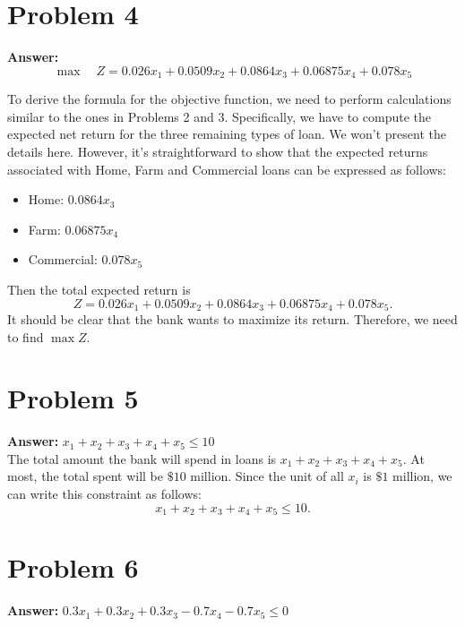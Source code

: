 \documentclass[11pt]{article}
\begin{document}
\section*{Problem 4}
\label{sec:org209078e}

\textbf{Answer:}
\begin{equation*}
\max\quad Z=0.026x_1+0.0509x_2+0.0864x_3+0.06875x_4+0.078x_5
\end{equation*}
\vspace{0.1cm}

To derive the formula for the objective function, we need to perform
calculations similar to the ones in Problems 2 and 3. Specifically, we have to
compute the expected net return for the three remaining types of loan. We won't
present the details here. However, it's straightforward to show that the
expected returns associated with Home, Farm and Commercial loans can be
expressed as follows:
\begin{itemize}
\item Home: \(0.0864x_3\)
\item Farm: \(0.06875x_4\)
\item Commercial: \(0.078x_5\)
\end{itemize}
Then the total expected return is
\begin{equation}
Z=0.026x_1+0.0509x_2+0.0864x_3+0.06875x_4+0.078x_5.
\end{equation}
It should be clear that the bank wants to maximize its return. Therefore, we
need to find \(\max Z\).
\section*{Problem 5}
\label{sec:org612217b}

\textbf{Answer:} \(x_1+x_2+x_3+x_4+x_5\leq 10\)\\

The total amount the bank will spend in loans is \(x_1+x_2+x_3+x_4+x_5\). At
most, the total spent will be \(\$ 10\) million. Since the unit of all \(x_i\)
is \(\$ 1\) million, we can write this constraint as follows:
\begin{equation}
x_1+x_2+x_3+x_4+x_5\leq 10.
\end{equation}
\section*{Problem 6}
\label{sec:org8f7664c}

\textbf{Answer:} \(0.3x_1+0.3x_2+0.3x_3-0.7x_4-0.7x_5\leq 0\)\\
\end{document}
